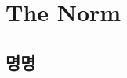\documentclass{42-ko}
\begin{document}
    \newpage

\chapter{The Norm}


    \section{명명}
\end{document}
